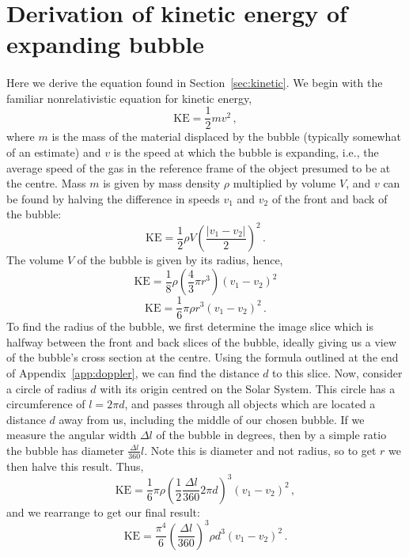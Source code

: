 \documentclass[a4paper, titlepage, oneside]{article}
\begin{document}
\section{Derivation of kinetic energy of expanding bubble}
\label{app:kinetic}
\paragraph{}
Here we derive the equation found in Section~\ref{sec:kinetic}. We begin with the familiar nonrelativistic equation for kinetic energy,
\begin{equation}
  \mathrm{KE} = \frac{1}{2} m v ^ 2 \, ,
\end{equation}
where \(m\) is the mass of the material displaced by the bubble (typically somewhat of an estimate) and \(v\) is the speed at which the bubble is expanding, i.e., the average speed of the gas in the reference frame of the object presumed to be at the centre. Mass \(m\) is given by mass density \(\rho\) multiplied by volume \(V\), and \(v\) can be found by halving the difference in speeds \(v_1\) and \(v_2\) of the front and back of the bubble:
\begin{equation}
  \mathrm{KE} = \frac{1}{2} \rho V { \left( \frac{\lvert v_1 - v_2 \rvert}{2} \right) }^2 \, .
\end{equation}
The volume \(V\) of the bubble is given by its radius, hence,
\begin{equation}
  \mathrm{KE} = \frac{1}{8} \rho \left( \frac{4}{3}\pi r^3 \right) {(v_1 - v_2)}^2
\end{equation} \begin{equation}
  \mathrm{KE} = \frac{1}{6} \pi \rho r^3 {(v_1 - v_2)}^2  \, .
\end{equation}
To find the radius of the bubble, we first determine the image slice which is halfway between the front and back slices of the bubble, ideally giving us a view of the bubble's cross section at the centre. Using the formula outlined at the end of Appendix~\ref{app:doppler}, we can find the distance \(d\) to this slice. Now, consider a circle of radius \(d\) with its origin centred on the Solar System. This circle has a circumference of \(l = 2 \pi d\), and passes through all objects which are located a distance \(d\) away from us, including the middle of our chosen bubble. If we measure the angular width \(\Delta l\) of the bubble in degrees, then by a simple ratio the bubble has diameter \(\frac{\Delta l}{360}l\). Note this is diameter and not radius, so to get \(r\) we then halve this result. Thus,
\begin{equation}
  \mathrm{KE} = \frac{1}{6} \pi \rho {\left( \frac{1}{2} \frac{\Delta l}{360} 2 \pi d \right)}^3 {(v_1 - v_2)}^2  \, ,
\end{equation}
and we rearrange to get our final result:
\begin{equation}
  \mathrm{KE} = \frac{\pi ^ 4}{6} {\left( \frac{\Delta l}{360} \right)}^3 \rho d^3 {(v_1 - v_2)}^2 \, .
\end{equation}
\end{document}
